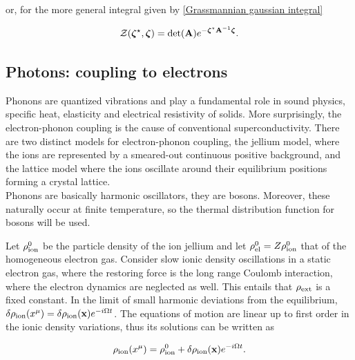 \documentclass{homework}
\begin{document}
or, for the more general integral given by \cref{Grassmannian gaussian integral}

\begin{equation}
    \mathcal{Z}(\bm{\zeta}^\star,\bm{\zeta}) = \det(\bf A) e^{-\bm{\zeta}^\star {\bf A}^{-1} \bm{\zeta}}. 
\end{equation}
\clearpage

\subsection{Photons: coupling to electrons}

Phonons are quantized vibrations and play a fundamental role in sound physics, specific heat, elasticity and electrical resistivity of solids. More surprisingly, the electron-phonon coupling is the cause of conventional superconductivity. There are two distinct models for electron-phonon coupling, the jellium model, where the ions are represented by a smeared-out continuous positive background, and the lattice model where the ions oscillate around their equilibrium positions forming a crystal lattice. \\

Phonons are basically harmonic oscillators, they are bosons. Moreover, these naturally occur at finite temperature, so the thermal distribution function for bosons will be used. \\

\iffalse

Let $\rho^0_{\textnormal{ion}}$ be the particle density of the ion jellium and let $\rho^0_{\textnormal{el}} = Z \rho^0_{\textnormal{ion}}$ that of the homogeneous electron gas. Consider slow ionic density oscillations in a static electron gas, where the restoring force is the long range Coulomb interaction, where the electron dynamics are neglected as well. This entails that $\rho_{\textnormal{ext}}$ is a fixed constant. In the limit of small harmonic deviations from the equilibrium, $\delta \rho_{\textnormal{ion}}(x^\mu) = \delta \rho_{\textnormal{ion}} ({\bf x}) e^{-i\Omega t}$. The equations of motion are linear up to first order in the ionic density variations, thus its solutions can be written as 

\begin{equation}
    \rho_{\textnormal{ion}}(x^\mu) = \rho^0_{\textnormal{ion}} + \delta \rho_{\textnormal{ion}} ({\bf x}) e^{-i\Omega t}.
\end{equation}
\end{document}
